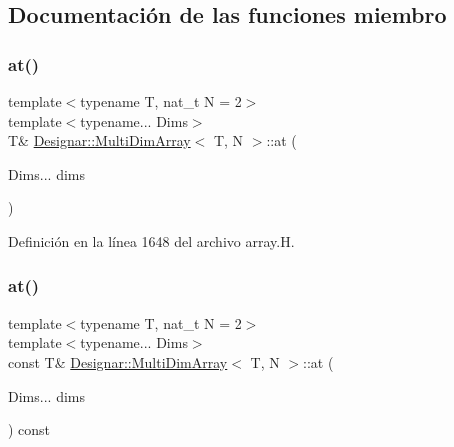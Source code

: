 \subsection{Documentación de las funciones miembro}
\mbox{\label{class_designar_1_1_multi_dim_array_a35f5b6b915a03e4ba04ccd28af40dc79}} 
\subsubsection{\texorpdfstring{at()}{at()}\hspace{0.1cm}{\footnotesize\ttfamily [1/2]}}
{\footnotesize\ttfamily template$<$typename T, nat\+\_\+t N = 2$>$ \\
template$<$typename... Dims$>$ \\
T\& \hyperlink{class_designar_1_1_multi_dim_array}{Designar\+::\+Multi\+Dim\+Array}$<$ T, N $>$\+::at (\begin{DoxyParamCaption}\item[{Dims...}]{dims }\end{DoxyParamCaption})\hspace{0.3cm}{\ttfamily [inline]}}



Definición en la línea 1648 del archivo array.\+H.

\mbox{\label{class_designar_1_1_multi_dim_array_aa6c5641e0839fae2bc8d1dadc134cc71}} 
\subsubsection{\texorpdfstring{at()}{at()}\hspace{0.1cm}{\footnotesize\ttfamily [2/2]}}
{\footnotesize\ttfamily template$<$typename T, nat\+\_\+t N = 2$>$ \\
template$<$typename... Dims$>$ \\
const T\& \hyperlink{class_designar_1_1_multi_dim_array}{Designar\+::\+Multi\+Dim\+Array}$<$ T, N $>$\+::at (\begin{DoxyParamCaption}\item[{Dims...}]{dims }\end{DoxyParamCaption}) const\hspace{0.3cm}{\ttfamily [inline]}}



